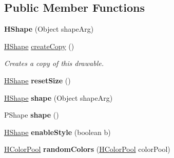 \subsection*{Public Member Functions}
\begin{DoxyCompactItemize}
\item 
\hypertarget{classhype_1_1drawable_1_1_h_shape_a53f04e8c4012ccb8577b1877637cd878}{{\bfseries H\-Shape} (Object shape\-Arg)}\label{classhype_1_1drawable_1_1_h_shape_a53f04e8c4012ccb8577b1877637cd878}

\item 
\hyperlink{classhype_1_1drawable_1_1_h_shape}{H\-Shape} \hyperlink{classhype_1_1drawable_1_1_h_shape_a3c87e6bdac6bbfeced9d25bfac8527b3}{create\-Copy} ()
\begin{DoxyCompactList}\small\item\em Creates a copy of this drawable. \end{DoxyCompactList}\item 
\hypertarget{classhype_1_1drawable_1_1_h_shape_a7b53aa8764021e6036540ceb0750541c}{\hyperlink{classhype_1_1drawable_1_1_h_shape}{H\-Shape} {\bfseries reset\-Size} ()}\label{classhype_1_1drawable_1_1_h_shape_a7b53aa8764021e6036540ceb0750541c}

\item 
\hypertarget{classhype_1_1drawable_1_1_h_shape_ae495de06427f5e8349fb3bd0274f6c29}{\hyperlink{classhype_1_1drawable_1_1_h_shape}{H\-Shape} {\bfseries shape} (Object shape\-Arg)}\label{classhype_1_1drawable_1_1_h_shape_ae495de06427f5e8349fb3bd0274f6c29}

\item 
\hypertarget{classhype_1_1drawable_1_1_h_shape_a2df9d3cd17b1a313c9967ba38178883f}{P\-Shape {\bfseries shape} ()}\label{classhype_1_1drawable_1_1_h_shape_a2df9d3cd17b1a313c9967ba38178883f}

\item 
\hypertarget{classhype_1_1drawable_1_1_h_shape_a9495563e316f5aaf8faa2dee58197e0a}{\hyperlink{classhype_1_1drawable_1_1_h_shape}{H\-Shape} {\bfseries enable\-Style} (boolean b)}\label{classhype_1_1drawable_1_1_h_shape_a9495563e316f5aaf8faa2dee58197e0a}

\item 
\hypertarget{classhype_1_1drawable_1_1_h_shape_afee75e474f4326fef8ede905140e69e9}{\hyperlink{classhype_1_1colorist_1_1_h_color_pool}{H\-Color\-Pool} {\bfseries random\-Colors} (\hyperlink{classhype_1_1colorist_1_1_h_color_pool}{H\-Color\-Pool} color\-Pool)}\label{classhype_1_1drawable_1_1_h_shape_afee75e474f4326fef8ede905140e69e9}


\end{DoxyCompactItemize}
